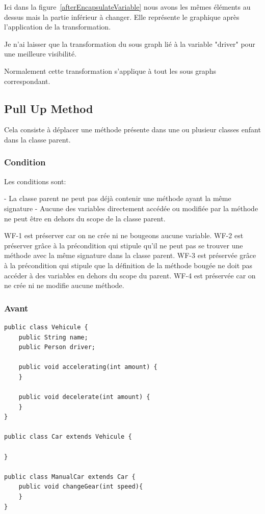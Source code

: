 \documentclass[a4paper, 12pt]{article}
\begin{document}
Ici dans la figure~\ref{afterEncapsulateVariable} nous avons les mêmes éléments au dessus mais la partie inférieur à changer. 
Elle représente le graphique après l'application de la transformation.

Je n'ai laisser que la transformation du sous graph lié à la variable "driver" pour une meilleure visibilité. 

Normalement cette transformation s'applique à tout les sous graphs correspondant.

\newpage 

\subsection{Pull Up Method}

Cela consiste à déplacer une méthode présente dans une ou plusieur classes enfant dans la classe parent. 

\subsubsection{Condition}
Les conditions sont:

- La classe parent ne peut pas déjà contenir une méthode ayant la même signature
- Aucune des variables directement accédée ou modifiée par la méthode ne peut être en dehors du scope de la classe parent.

WF-1 est préserver car on ne crée ni ne bougeons aucune variable.
WF-2 est préserver grâce à la précondition qui stipule qu'il ne peut pas se trouver une méthode avec la même signature dans la classe parent.
WF-3 est préservée grâce à la précondition qui stipule que la définition de la méthode bougée ne doit pas accéder à des variables en dehors du scope du parent.
WF-4 est préservée car on ne crée ni ne modifie aucune méthode.

\subsubsection{Avant}
\begin{lstlisting}[frame=single]
public class Vehicule {
	public String name;
	public Person driver;

	public void accelerating(int amount) { 
	}

	public void decelerate(int amount) { 
	}
}

public class Car extends Vehicule {

}

public class ManualCar extends Car {
	public void changeGear(int speed){ 
	}
}
\end{lstlisting}
\end{document}
